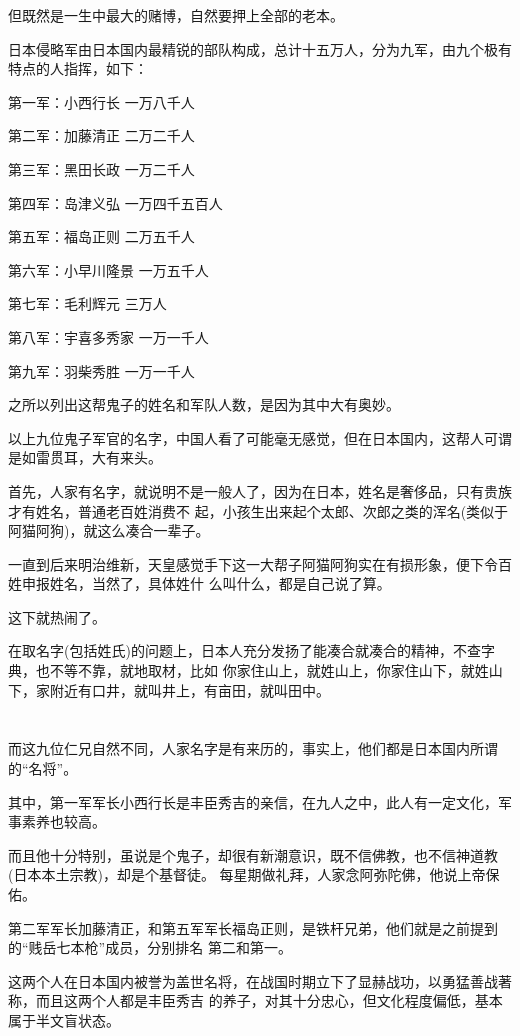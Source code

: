 \documentclass[11pt,a4paper,onecolumn]{article}
\begin{document}
但既然是一生中最大的赌博，自然要押上全部的老本。

日本侵略军由日本国内最精锐的部队构成，总计十五万人，分为九军，由九个极有特点的人指挥，如下：

第一军：小西行长 一万八千人

第二军：加藤清正 二万二千人

第三军：黑田长政 一万二千人

第四军：岛津义弘 一万四千五百人

第五军：福岛正则 二万五千人

第六军：小早川隆景 一万五千人

第七军：毛利辉元 三万人

第八军：宇喜多秀家 一万一千人

第九军：羽柴秀胜 一万一千人

之所以列出这帮鬼子的姓名和军队人数，是因为其中大有奥妙。

以上九位鬼子军官的名字，中国人看了可能毫无感觉，但在日本国内，这帮人可谓是如雷贯耳，大有来头。

首先，人家有名字，就说明不是一般人了，因为在日本，姓名是奢侈品，只有贵族才有姓名，普通老百姓消费不
起，小孩生出来起个太郎、次郎之类的浑名(类似于阿猫阿狗)，就这么凑合一辈子。

一直到后来明治维新，天皇感觉手下这一大帮子阿猫阿狗实在有损形象，便下令百姓申报姓名，当然了，具体姓什
么叫什么，都是自己说了算。

这下就热闹了。

在取名字(包括姓氏)的问题上，日本人充分发扬了能凑合就凑合的精神，不查字典，也不等不靠，就地取材，比如
你家住山上，就姓山上，你家住山下，就姓山下，家附近有口井，就叫井上，有亩田，就叫田中。

\section[\thesection]{}

而这九位仁兄自然不同，人家名字是有来历的，事实上，他们都是日本国内所谓的``名将''。

其中，第一军军长小西行长是丰臣秀吉的亲信，在九人之中，此人有一定文化，军事素养也较高。

而且他十分特别，虽说是个鬼子，却很有新潮意识，既不信佛教，也不信神道教(日本本土宗教)，却是个基督徒。
每星期做礼拜，人家念阿弥陀佛，他说上帝保佑。

第二军军长加藤清正，和第五军军长福岛正则，是铁杆兄弟，他们就是之前提到的``贱岳七本枪''成员，分别排名
第二和第一。

这两个人在日本国内被誉为盖世名将，在战国时期立下了显赫战功，以勇猛善战著称，而且这两个人都是丰臣秀吉
的养子，对其十分忠心，但文化程度偏低，基本属于半文盲状态。
\end{document}
